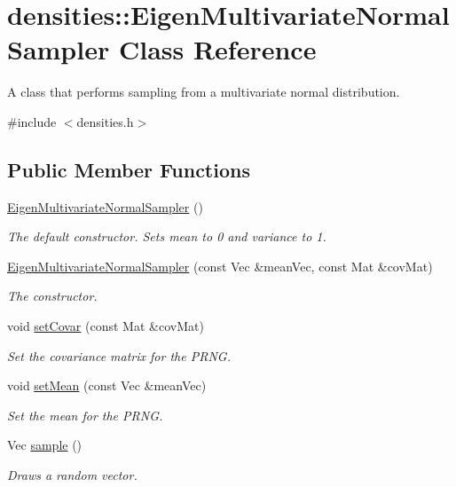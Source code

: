 \hypertarget{classdensities_1_1EigenMultivariateNormalSampler}{}\section{densities\+:\+:Eigen\+Multivariate\+Normal\+Sampler Class Reference}
\label{classdensities_1_1EigenMultivariateNormalSampler}


A class that performs sampling from a multivariate normal distribution.  




{\ttfamily \#include $<$densities.\+h$>$}

\subsection*{Public Member Functions}
\begin{DoxyCompactItemize}
\item 
\hyperlink{classdensities_1_1EigenMultivariateNormalSampler_afb0b000a64346ba806b3700de9b8afea}{Eigen\+Multivariate\+Normal\+Sampler} ()\hypertarget{classdensities_1_1EigenMultivariateNormalSampler_afb0b000a64346ba806b3700de9b8afea}{}\label{classdensities_1_1EigenMultivariateNormalSampler_afb0b000a64346ba806b3700de9b8afea}

\begin{DoxyCompactList}\small\item\em The default constructor. Sets mean to 0 and variance to 1. \end{DoxyCompactList}\item 
\hyperlink{classdensities_1_1EigenMultivariateNormalSampler_a88ccb69ae36d08f0e02edc3d1f6eed9a}{Eigen\+Multivariate\+Normal\+Sampler} (const Vec \&mean\+Vec, const Mat \&cov\+Mat)
\begin{DoxyCompactList}\small\item\em The constructor. \end{DoxyCompactList}\item 
void \hyperlink{classdensities_1_1EigenMultivariateNormalSampler_a427e1c188728a79b09c830a6ebb68806}{set\+Covar} (const Mat \&cov\+Mat)
\begin{DoxyCompactList}\small\item\em Set the covariance matrix for the P\+R\+NG. \end{DoxyCompactList}\item 
void \hyperlink{classdensities_1_1EigenMultivariateNormalSampler_ac16661e6277bafea22edb63b72bc81ba}{set\+Mean} (const Vec \&mean\+Vec)
\begin{DoxyCompactList}\small\item\em Set the mean for the P\+R\+NG. \end{DoxyCompactList}\item 
Vec \hyperlink{classdensities_1_1EigenMultivariateNormalSampler_a70a1102dae2f055ebe78657395d11271}{sample} ()
\begin{DoxyCompactList}\small\item\em Draws a random vector. \end{DoxyCompactList}\end{DoxyCompactItemize}


